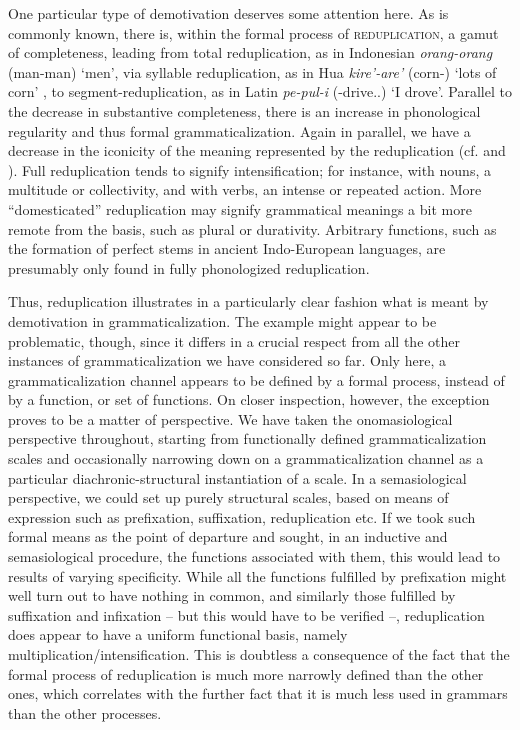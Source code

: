 \enlargethispage{1\baselineskip}
One particular type of demotivation deserves some attention here. As is commonly known, there is, within the formal process of \textsc{reduplication}, a gamut of completeness, leading from total reduplication, as in Indonesian \textit{orang-orang} (man-man) ‘men’, via syllable reduplication, as in Hua \textit{kire'-are'} (corn-\rdp) ‘lots of corn’ \citep[222]{Haiman1980}, to segment-reduplication, as in Latin \textit{pe-pul-i} (\rdp-drive..\glsg) ‘I drove’. Parallel to the decrease in substantive completeness, there is an increase in phonological regularity and thus formal grammaticalization. Again in parallel, we have a decrease in the iconicity of the meaning represented by the reduplication (cf. \citealt{André1978} and \citealt[46--48]{HeineEtAl1984}). Full reduplication tends to signify intensification; for instance, with nouns, a multitude or collectivity, and with verbs, an intense or repeated action. More “domesticated” reduplication may signify grammatical meanings a bit more remote from the basis, such as plural or durativity. Arbitrary functions, such as the formation of perfect stems in ancient Indo-European languages, are presumably only found in fully phonologized reduplication.

Thus, reduplication illustrates in a particularly clear fashion what is meant by demotivation in grammaticalization. The example might appear to be problematic, though, since it differs in a crucial respect from all the other instances of grammaticalization we have considered so far. Only here, a grammaticalization channel appears to be defined by a formal process, instead of by a function, or set of functions. On closer inspection, however, the exception proves to be a matter of perspective. We have taken the onomasiological perspective throughout, starting from functionally defined grammaticalization scales and occasionally narrowing down on a grammaticalization channel as a particular diachronic-structural instantiation of a scale. In a semasiological perspective, we could set up purely structural scales, based on means of expression such as prefixation, suffixation, reduplication etc. If we took such formal means as the point of departure and sought, in an inductive and semasiological procedure, the functions associated with them, this would lead to results of varying specificity. While all the functions fulfilled by prefixation might well turn out to have nothing in common, and similarly those fulfilled by suffixation and infixation -- but this would have to be verified --, reduplication does appear to have a uniform functional basis, namely multiplication/intensification. This is doubtless a consequence of the fact that the formal process of reduplication is much more narrowly defined than the other ones, which correlates with the further fact that it is much less used in grammars than the other processes.

